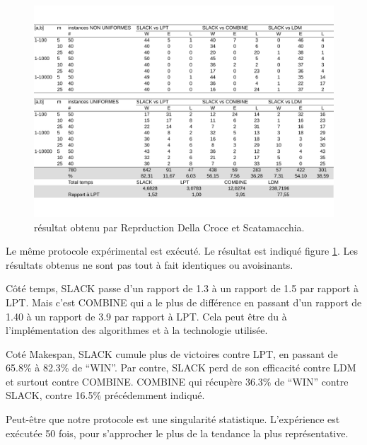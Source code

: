 \documentclass[a4paper,12pt]{report}
\theoremstyle{plain}				%
\theoremstyle{definition}				%
\begin{document}
\begin{figure}
{\centering
\includegraphics[width=\columnwidth]{3_Resultat_Reproduction_De_DCS.pdf}
\caption{résultat obtenu par Reprduction Della Croce et Scatamacchia.}
\label{fig:resultatReproductionDellaCroceScatamacchia}
\par}
\end{figure}

Le même protocole expérimental est exécuté. Le résultat est indiqué 
  figure \ref{fig:resultatReproductionDellaCroceScatamacchia}. 
Les résultats obtenus ne sont pas tout à fait identiques ou avoisinants. 
  
Côté temps, SLACK passe d'un rapport de 1.3 à un rapport de 1.5 par rapport à LPT. 
Mais c'est COMBINE qui a le plus de différence en passant d'un rapport de 1.40 
  à un rapport de 3.9 par rapport à LPT. 
Cela peut être du à l'implémentation des algorithmes et à la technologie utilisée. 

Coté Makespan, SLACK cumule plus de victoires contre LPT, en passant de 65.8\% à 82.3\% de ``WIN''.
Par contre, SLACK perd de son efficacité contre LDM et surtout contre COMBINE. COMBINE qui récupère 36.3\% de ``WIN'' contre SLACK, contre 16.5\% précédemment indiqué.


Peut-être que notre protocole est une singularité statistique. L'expérience est exécutée 50 fois, pour s'approcher le plus de la tendance la plus représentative.
\end{document}
